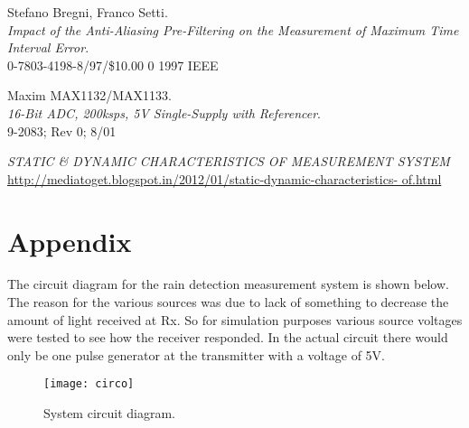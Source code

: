 \documentclass[conference, 11pt]{IEEEtran}
\begin{document}
\begin{thebibliography}{22}
Stefano Bregni, Franco Setti.\\
\textit{Impact of the Anti-Aliasing Pre-Filtering on the Measurement of Maximum Time Interval Error}. \\
0-7803-4198-8/97/\$10.00 0 1997 IEEE


Maxim MAX1132/MAX1133.\\
\textit{16-Bit ADC, 200ksps, 5V Single-Supply with Referencer}. \\
9-2083; Rev 0; 8/01




\textit{STATIC \& DYNAMIC CHARACTERISTICS OF MEASUREMENT SYSTEM}
\url{http://mediatoget.blogspot.in/2012/01/static-dynamic-characteristics- of.html}

\end{thebibliography}

\newpage
\onecolumn
\section*{Appendix}
The circuit diagram for the rain detection measurement system is shown below. The reason for the various sources was due to lack of something to decrease the amount of light received at Rx. So for simulation purposes various source voltages were tested to see how the receiver responded. In the actual circuit there would only be one pulse generator at the transmitter with a voltage of 5V. 

 \begin{figure}[H]
 \centering 
 \texttt{[image: circo]}
 \centering 
  \caption {System circuit diagram. }
 \end{figure}
\end{document}

